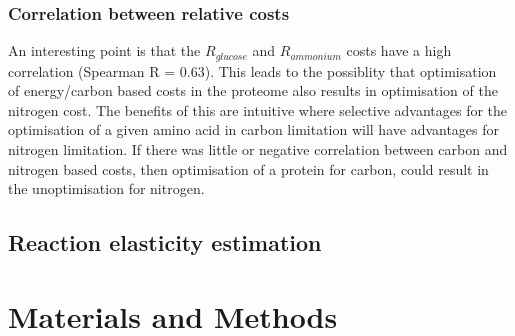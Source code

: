 \subsubsection{Correlation between relative costs}

An interesting point is that the $R_{glucose}$ and $R_{ammonium}$ costs have a high correlation (Spearman R = 0.63). This leads to the possiblity that optimisation of energy/carbon based costs in the proteome also results in optimisation of the nitrogen cost. The benefits of this are intuitive where selective advantages for the optimisation of a given amino acid in carbon limitation will have advantages for nitrogen limitation. If there was little or negative correlation between carbon and nitrogen based costs, then optimisation of a protein for carbon, could result in the unoptimisation for nitrogen.

\subsection{Reaction elasticity estimation}

\section{Materials and Methods}
